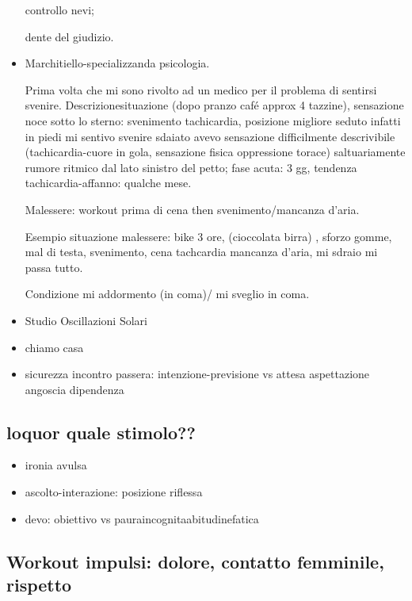\begin{itemize}
controllo nevi;

dente del giudizio.

\item Marchitiello-specializzanda psicologia.

Prima volta che mi sono rivolto ad un medico per il problema di sentirsi svenire. Descrizionesituazione (dopo pranzo caf\'e approx 4 tazzine), sensazione noce sotto lo sterno: svenimento tachicardia, posizione migliore seduto infatti in piedi mi sentivo svenire sdaiato avevo sensazione difficilmente descrivibile (tachicardia-cuore in gola, sensazione fisica oppressione torace) saltuariamente rumore ritmico dal lato sinistro del petto; fase acuta: 3 gg, tendenza tachicardia-affanno: qualche mese.

Malessere: workout prima di cena then svenimento/mancanza d'aria.

Esempio situazione malessere: bike 3 ore, (cioccolata birra) , sforzo gomme, mal di testa, svenimento, cena tachcardia mancanza d'aria, mi sdraio mi passa tutto.

Condizione mi addormento (in coma)/ mi sveglio in coma.

\item Studio Oscillazioni Solari

\item chiamo casa

\item sicurezza incontro passera: intenzione-previsione vs attesa aspettazione angoscia dipendenza

\end{itemize}

\subsection{loquor quale stimolo??}

\begin{itemize}

\item ironia avulsa

\item ascolto-interazione: posizione riflessa

\item devo: obiettivo vs pauraincognitaabitudinefatica

\end{itemize}

\subsection{Workout impulsi: dolore, contatto femminile, rispetto}

